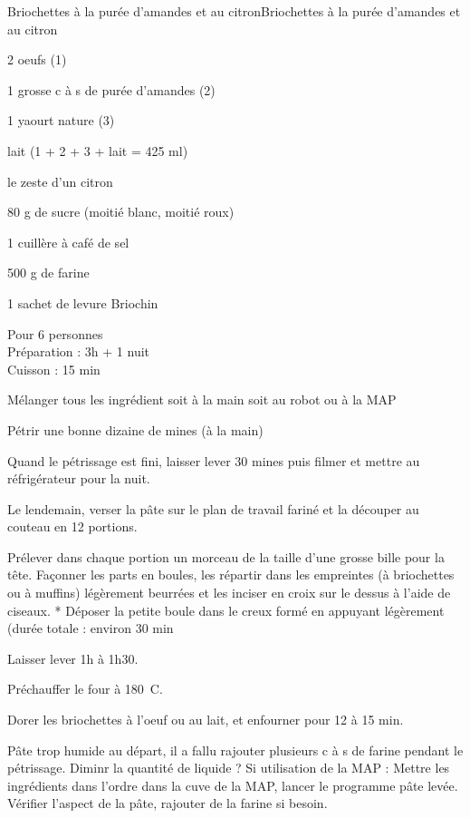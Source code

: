 \begin{recette}{Briochettes à la purée d'amandes et au citron}{Briochettes à la purée d'amandes et au citron}

\begin{ingredients}
2 oeufs (1)\par
1 grosse c à s de purée d'amandes (2)\par
1 yaourt nature (3)\par
lait (1 + 2 + 3 + lait = 425 ml)\par
le zeste d'un citron\par
80 g de sucre (moitié blanc, moitié roux)\par
1 cuillère à café de sel\par
500 g de farine\par
1 sachet de levure Briochin\par
\end{ingredients}

\begin{infos}
Pour 6 personnes\\
Préparation : 3h + 1 nuit\\
Cuisson : 15 min\\
\end{infos}

\begin{etapes}
\item Mélanger tous les ingrédient soit à la main soit au robot ou à la MAP
\item Pétrir une bonne dizaine de mines (à la main)
\item Quand le pétrissage est fini, laisser lever 30 mines puis filmer et mettre au réfrigérateur pour la nuit.
\item Le lendemain, verser la pâte sur le plan de travail fariné et la découper au couteau en 12 portions.
\item Prélever dans chaque portion un morceau de la taille d'une grosse bille pour la tête. Façonner les parts en boules, les répartir dans les empreintes (à briochettes ou à muffins) légèrement beurrées et les inciser en croix sur le dessus à l'aide de ciseaux. * Déposer la petite boule dans le creux formé en appuyant légèrement (durée totale : environ 30 min
\item Laisser lever 1h à 1h30.
\item Préchauffer le four à 180\ C.
\item Dorer les briochettes à l'oeuf ou au lait, et enfourner pour 12 à 15 min.
\end{etapes}

\begin{conseils}
Pâte trop humide au départ, il a fallu rajouter plusieurs c à s de farine pendant le pétrissage. Diminr la quantité de liquide ?
Si utilisation de la MAP : Mettre les ingrédients dans l'ordre dans la cuve de la MAP, lancer le programme pâte levée. Vérifier l'aspect de la pâte, rajouter de la farine si besoin.
\end{conseils}

\end{recette}